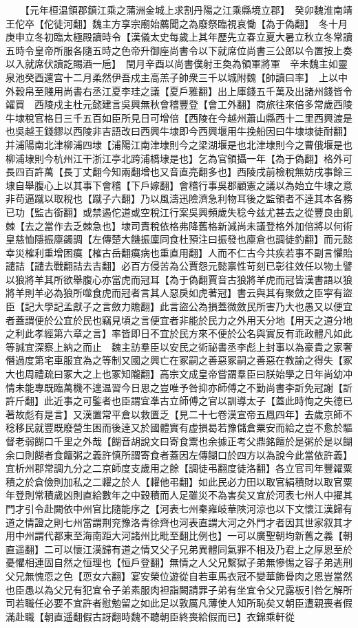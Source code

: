 　　【元年桓温領郡鎮江乘之蒲洲金城上求割丹陽之江乘縣境立郡】　癸卯魏淮南靖王佗卒【佗徒河翻】魏主方享宗廟始薦聞之為廢祭臨視哀慟【為于偽翻】　冬十月庚申立冬初臨太極殿讀時令【漢儀太史每歲上其年歷先立春立夏大暑立秋立冬常讀五時令皇帝所服各隨五時之色帝升御座尚書令以下就席位尚書三公郎以令置按上奏以入就席伏讀訖賜酒一巵】　閏月辛酉以尚書僕射王奐為領軍將軍　辛未魏主如靈泉池癸酉還宫十二月柔然伊吾戍主高羔子帥衆三千以城附魏【帥讀曰率】　上以中外穀帛至賤用尚書右丞江夏李珪之議【夏戶雅翻】出上庫錢五千萬及出諸州錢皆令糴買　西陵戍主杜元懿建言吳興無秋會稽豐登【會工外翻】商旅往來倍多常歲西陵牛埭稅官格日三千五百如臣所見日可增倍【西陵在今越州蕭山縣西十二里西興渡是也吳越王錢鏐以西陵非吉語改曰西興牛埭即今西興堰用牛挽船因曰牛埭埭徒耐翻】并浦陽南北津柳浦四埭【浦陽江南津埭則今之梁湖堰是也北津埭則今之曹俄堰是也柳浦埭則今杭州江干浙江亭北跨浦橋埭是也】乞為官領攝一年【為于偽翻】格外可長四百許萬【長丁丈翻今知兩翻增也又音直亮翻多也】西陵戌前檢稅無妨戌事餘三埭自舉腹心上以其事下會稽【下戶嫁翻】會稽行事吳郡顧憲之議以為始立牛埭之意非苟逼蹴以取稅也【蹴子六翻】乃以風濤迅險濟急利物耳後之監領者不逹其本各務已功【監古銜翻】或禁遏佗道或空稅江行案吳興頻歲失稔今兹尤甚去之從豐良由飢棘【去之當作去乏棘急也】埭司責稅依格弗降舊格新減尚未議登格外加倍將以何術皇慈恤隱振廪蠲調【左傳楚大饑振廩同食杜預注曰振發也廪倉也調徒釣翻】而元懿幸災榷利重增困瘼【榷古岳翻瘼病也重直用翻】人而不仁古今共疾若事不副言懼貽譴詰【譴去戰翻詰去吉翻】必百方侵苦為公賈怨元懿禀性苛刻已彰往效任以物土譬以狼將羊其所欲舉腹心亦當虎而冠耳【為于偽翻賈音古狼將羊虎而冠皆漢書語以狼將羊則羊必為狼所噬食虎而冠者言其人惡戾如虎著冠】書云與其有聚斂之臣寜有盜臣【記大學記孟獻子之言斂力贍翻】此言盜公為損蓋微斂民所害乃大也愚又以便宜者蓋謂便於公宜於民也竊見頃之言便宜者非能於民力之外用天分地【用天之道分地之利此孝經第六章之言】率皆即日不宜於民方來不便於公名與實反有乖政體凡如此等誠宜深察上納之而止　魏主訪羣臣以安民之術祕書丞李彪上封事以為豪貴之家奢僭過度第宅車服宜為之等制又國之興亡在冢嗣之善惡冢嗣之善惡在教諭之得失【冢大也周禮疏曰冢大之上也冢知隴翻】高宗文成皇帝嘗謂羣臣曰朕始學之日年尚幼冲情未能專既臨萬機不遑温習今日思之豈唯予咎抑亦師傅之不勤尚書李訢免冠謝【訢許斤翻】此近事之可鍳者也臣謂宜凖古立師傅之官以訓導太子【蓋此時恂之失德已著故彪有是言】又漢置常平倉以救匱乏【見二十七卷漢宣帝五鳳四年】去歲京師不稔移民就豐既廢營生困而後逹又於國體實有虚損曷若豫儲倉粟安而給之豈不愈於驅督老弱餬口千里之外哉【餬音胡說文曰寄食鬻也余據正考父鼎銘饘於是粥於是以餬余口則餬者食饘粥之義許慎所謂寄食者蓋因左傳餬口於四方以為說今此當依許義】宜析州郡常調九分之二京師度支歲用之餘【調徒弔翻度徒洛翻】各立官司年豐糴粟積之於倉儉則加私之二糶之於人【糶他弔翻】如此民必力田以取官絹積財以取官粟年登則常積歲凶則直給數年之中穀積而人足雖災不為害矣又宜於河表七州人中擢其門才引令赴闕依中州官比隨能序之【河表七州秦雍岐華陜河涼也以下文懷江漢歸有道之情證之則七州當謂荆兖豫洛青徐齊也河表直謂大河之外門才者因其世家叙其才用中州謂代都東至海南距大河諸州比毗至翻比例也】一可以廣聖朝均新舊之義【朝直遥翻】二可以懷江漢歸有道之情又父子兄弟異體同氣罪不相及乃君上之厚恩至於憂懼相連固自然之恒理也【恒戶登翻】無情之人父兄繫獄子弟無慘惕之容子弟逃刑父兄無愧恧之色【恧女六翻】宴安榮位遊從自若車馬衣冠不變華飾骨肉之恩豈當然也臣愚以為父兄有犯宜令子弟素服肉袒詣闕請罪子弟有坐宜令父兄露板引咎乞解所司若職任必要不宜許者慰勉留之如此足以敦厲凡薄使人知所恥矣又朝臣遭親喪者假滿赴職【朝直遥翻假古訝翻時魏不聽朝臣終喪給假而已】衣錦乘軒從
